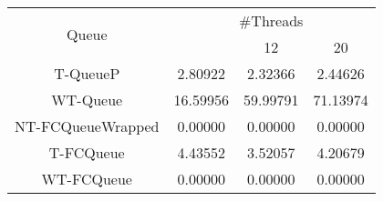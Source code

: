 \begin{tabular}{|c|c|c|c|}
\hline
\multirow{2}{*}{Queue} & \multicolumn{3}{c|}{\#Threads}\\\cline{2-4}& \quad 4 & 12 & 20\\
\hline
\hline
T-QueueP & 2.80922 & 2.32366 & 2.44626\\
WT-Queue & 16.59956 & 59.99791 & 71.13974\\
NT-FCQueueWrapped & 0.00000 & 0.00000 & 0.00000\\
T-FCQueue & 4.43552 & 3.52057 & 4.20679\\
WT-FCQueue & 0.00000 & 0.00000 & 0.00000\\
\hline\end{tabular}
